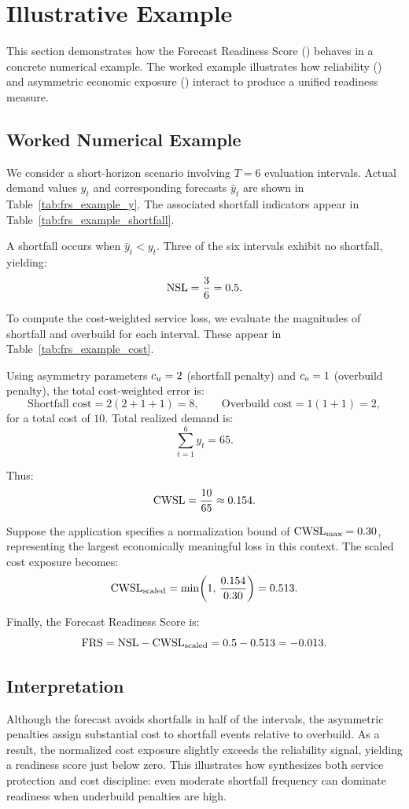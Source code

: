 \section{Illustrative Example}

This section demonstrates how the Forecast Readiness Score (\FRS) behaves in a
concrete numerical example. The worked example illustrates how reliability
(\NSL) and asymmetric economic exposure (\CWSLscaled) interact to produce a
unified readiness measure.

\subsection{Worked Numerical Example}

We consider a short-horizon scenario involving \(T = 6\) evaluation intervals.
Actual demand values \(y_t\) and corresponding forecasts \(\hat{y}_t\) are shown
in Table~\ref{tab:frs_example_y}. The associated shortfall indicators appear in
Table~\ref{tab:frs_example_shortfall}.




A shortfall occurs when \(\hat{y}_t < y_t\). Three of the six intervals exhibit
no shortfall, yielding:
\[
\text{NSL} = \frac{3}{6} = 0.5.
\]

To compute the cost-weighted service loss, we evaluate the magnitudes of
shortfall and overbuild for each interval. These appear in
Table~\ref{tab:frs_example_cost}.



Using asymmetry parameters \(c_u = 2\) (shortfall penalty) and \(c_o = 1\)
(overbuild penalty), the total cost-weighted error is:
\[
\text{Shortfall cost} = 2(2 + 1 + 1) = 8, \qquad
\text{Overbuild cost} = 1(1 + 1) = 2,
\]
for a total cost of \(10\). Total realized demand is:
\[
\sum_{t=1}^6 y_t = 65.
\]

Thus:
\[
\text{CWSL} = \frac{10}{65} \approx 0.154.
\]

Suppose the application specifies a normalization bound of
\(\mathrm{CWSL}_{\max} = 0.30\), representing the largest economically meaningful loss in
this context. The scaled cost exposure becomes:
\[
\mathrm{CWSL}_{\mathrm{scaled}} = \min\!\left( 1,\, \frac{0.154}{0.30} \right) = 0.513.
\]

Finally, the Forecast Readiness Score is:
\[
\mathrm{FRS} = \text{NSL} - \mathrm{CWSL}_{\mathrm{scaled}}
     = 0.5 - 0.513
     = -0.013.
\]

\subsection*{Interpretation}

Although the forecast avoids shortfalls in half of the intervals, the asymmetric
penalties assign substantial cost to shortfall events relative to overbuild. As
a result, the normalized cost exposure slightly exceeds the reliability signal,
yielding a readiness score just below zero. This illustrates how \FRS{}
synthesizes both service protection and cost discipline: even moderate shortfall
frequency can dominate readiness when underbuild penalties are high.

